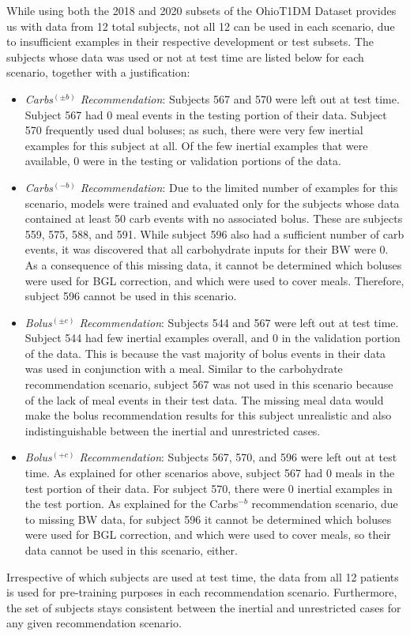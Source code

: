 While using both the 2018 and 2020 subsets of the OhioT1DM Dataset \cite{ohiot1dm:marling:kdh18, ohiot1dm:marling:kdh20} provides us with data from 12 total subjects, not all 12 can be used in each scenario, due to insufficient examples in their respective development or test subsets. The subjects whose data was used or not at test time are listed below for each scenario, together with a justification:
\begin{itemize}
    \item {\it Carbs$^{(\pm b)}$ Recommendation}: Subjects 567 and 570 were left out at test time. Subject 567 had 0 meal events in the testing portion of their data. Subject 570 frequently used dual boluses; as such, there were very few inertial examples for this subject at all. Of the few inertial examples that were available, 0 were in the testing or validation portions of the data.
    \item {\it Carbs$^{(-b)}$ Recommendation}: Due to the limited number of examples for this scenario, models were trained and evaluated only for the subjects whose data contained at least 50 carb events with no associated bolus. These are subjects 559, 575, 588, and 591. While subject 596 also had a sufficient number of carb events, it was discovered that all carbohydrate inputs for their \ac{BW} were 0. As a consequence of this missing data, it cannot be determined which boluses were used for \ac{BGL} correction, and which were used to cover meals. Therefore, subject 596 cannot be used in this scenario.
    \item {\it Bolus$^{(\pm c)}$ Recommendation}: Subjects 544 and 567 were left out at test time. Subject 544  had few inertial examples overall, and 0 in the validation portion of the data. This is because the vast majority of bolus events in their data was used in conjunction with a meal. Similar to the carbohydrate recommendation scenario, subject 567 was not used in this scenario because of the lack of meal events in their test data. The missing meal data would make the bolus recommendation results for this subject unrealistic and also indistinguishable between the inertial and unrestricted cases.
    \item {\it Bolus$^{(+c)}$ Recommendation}: Subjects 567, 570, and 596 were left out at test time. As explained for other scenarios above, subject 567 had 0 meals in the test portion of their data. For subject 570, there were 0 inertial examples in the test portion. As explained for the Carbs$^{-b}$ recommendation scenario, due to missing \ac{BW} data, for subject 596 it cannot be determined which boluses were used for \ac{BGL} correction, and which were used to cover meals, so their data cannot be used in this scenario, either.
\end{itemize}
Irrespective of which subjects are used at test time, the data from all 12 patients is used for pre-training purposes in each recommendation scenario. Furthermore, the set of subjects stays consistent between the inertial and unrestricted cases for any given recommendation scenario.

